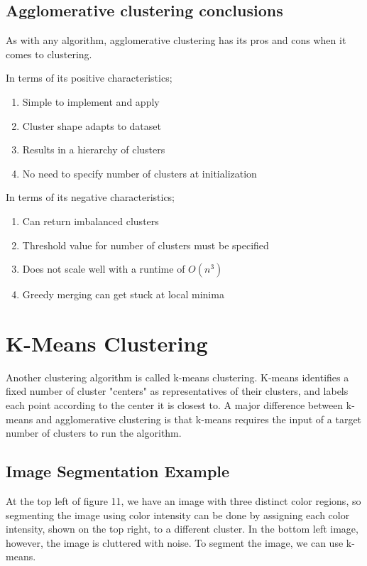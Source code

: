 \documentclass{article}
\begin{document}
\subsection{Agglomerative clustering conclusions}
As with any algorithm, agglomerative clustering has its pros and cons when it comes to clustering. 

In terms of its positive characteristics;
\begin{enumerate}
	\item Simple to implement and apply
	\item Cluster shape adapts to dataset
	\item Results in a hierarchy of clusters
	\item No need to specify number of clusters at initialization
\end{enumerate}

In terms of its negative characteristics;
\begin{enumerate}
	\item Can return imbalanced clusters
	\item Threshold value for number of clusters must be specified
	\item Does not scale well with a runtime of $O(n^3)$
	\item Greedy merging can get stuck at local minima
\end{enumerate}

\section{K-Means Clustering}
Another clustering algorithm is called k-means clustering. K-means identifies a fixed number of cluster "centers" as representatives of their clusters, and labels each point according to the center it is closest to. A major difference between k-means and agglomerative clustering is that k-means requires the input of a target number of clusters to run the algorithm.
\subsection{Image Segmentation Example}
At the top left of figure 11, we have an image with three distinct color regions, so segmenting the image using color intensity can be done by assigning each color intensity, shown on the top right, to a different cluster. In the bottom left image, however, the image is cluttered with noise. To segment the image, we can use k-means.
\end{document}
